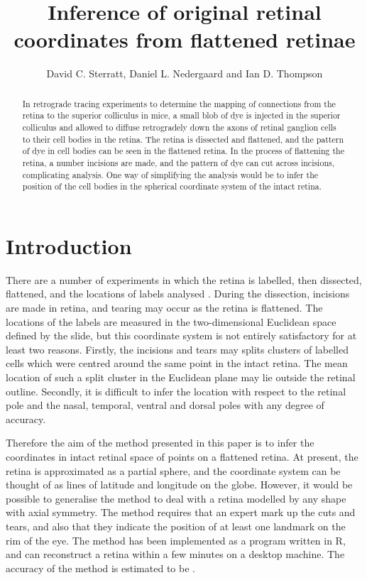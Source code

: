 \documentclass{article}
\title{Inference of original retinal coordinates from  flattened
  retinae}
\author{David C. Sterratt, Daniel L. Nedergaard and Ian D. Thompson}
\begin{document}
\maketitle
\thispagestyle{myheadings}

\begin{abstract}
  In retrograde tracing experiments to determine the mapping of
  connections from the retina to the superior colliculus in mice, a
  small blob of dye is injected in the superior colliculus and allowed
  to diffuse retrogradely down the axons of retinal ganglion cells to
  their cell bodies in the retina. The retina is dissected and
  flattened, and the pattern of dye in cell bodies can be seen in the
  flattened retina.  In the process of flattening the retina, a number
  incisions are made, and the pattern of dye can cut across incisions,
  complicating analysis.  One way of simplifying the analysis would be
  to infer the position of the cell bodies in the spherical coordinate
  system of the intact retina.  
\end{abstract}

\section{Introduction}
\label{fold-sphere:sec:introduction}

There are a number of experiments in which the retina is labelled,
then dissected, flattened, and the locations of labels analysed
\citep{RashEtal05oppo} .
During the dissection, incisions are made in retina, and tearing may
occur as the retina is flattened. The locations of the labels are
measured in the two-dimensional Euclidean space defined by the slide,
but this coordinate system is not entirely satisfactory for at least
two reasons. Firstly, the incisions and tears may splits clusters of
labelled cells which were centred around the same point in the intact
retina. The mean location of such a split cluster in the Euclidean
plane may lie outside the retinal outline. Secondly, it is difficult
to infer the location with respect to the retinal pole and the nasal,
temporal, ventral and dorsal poles with any degree of accuracy.

Therefore the aim of the method presented in this paper is to infer
the coordinates in intact retinal space of points on a flattened
retina. At present, the retina is approximated as a partial sphere,
and the coordinate system can be thought of as lines of latitude and
longitude on the globe. However, it would be possible to generalise
the method to deal with a retina modelled by any shape with axial
symmetry.  The method requires that an expert mark up the cuts and
tears, and also that they indicate the position of at least one
landmark on the rim of the eye. The method has been implemented as a
program written in R, and can reconstruct a retina within a few
minutes on a desktop machine. The accuracy of the method is estimated
to be .
\end{document}
